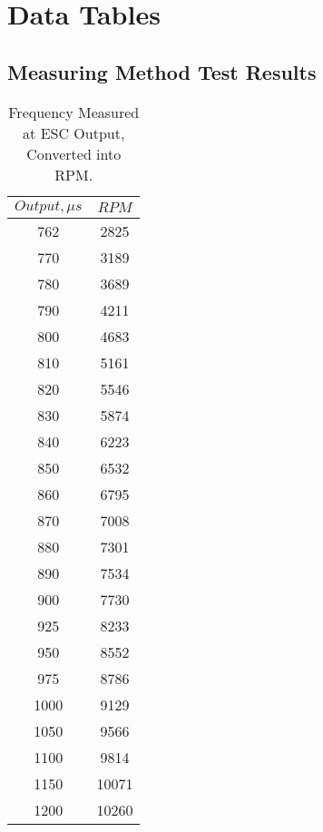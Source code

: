 \section{Data Tables}
\subsection{Measuring Method Test Results}
\begin{table}[H]
\centering
\begin{tabular}{|c|c|}
\hline
$Output,\mu s$ 	& $RPM$ \\ \hline
762 			& 2825  \\ \hline
770				& 3189	\\ \hline
780				& 3689	\\ \hline
790				& 4211	\\ \hline
800 			& 4683  \\ \hline
810 			& 5161	\\ \hline
820 			& 5546  \\ \hline
830				& 5874 	\\ \hline
840				& 6223	\\ \hline
850 			& 6532	\\ \hline
860 			& 6795	\\ \hline
870 			& 7008	\\ \hline
880 			& 7301	\\ \hline
890 			& 7534	\\ \hline
900 			& 7730	\\ \hline
925 			& 8233	\\ \hline
950 			& 8552	\\ \hline
975 			& 8786	\\ \hline
1000 			& 9129	\\ \hline
1050 			& 9566	\\ \hline
1100 			& 9814	\\ \hline
1150 			& 10071	\\ \hline
1200			& 10260	\\ \hline
\end{tabular}
\caption{Frequency Measured at ESC Output, Converted into RPM.}
\label{FreqTable}
\end{table}

